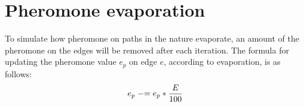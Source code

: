 \section{Pheromone evaporation}
\label{sec:evaporation}
To simulate how pheromone on paths in the nature evaporate, an amount of the pheromone on the edges will be removed after each iteration.
The formula for updating the pheromone value $e_p$ on edge $e$, according to evaporation, is as follows: 
\newline
$$e_p \mathrel{-}= e_p*\frac{E}{100}$$
\newline


